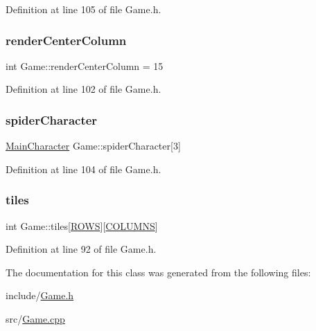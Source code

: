 Definition at line 105 of file Game.\+h.

\mbox{\label{class_game_a7850257252f36f13b0daa694e43e1de9}} 
\subsubsection{\texorpdfstring{renderCenterColumn}{renderCenterColumn}}
{\footnotesize\ttfamily int Game\+::render\+Center\+Column = 15}



Definition at line 102 of file Game.\+h.

\mbox{\label{class_game_ad513055bd8c23f50f6b5cf30ed3839c0}} 
\subsubsection{\texorpdfstring{spiderCharacter}{spiderCharacter}}
{\footnotesize\ttfamily \mbox{\hyperlink{class_main_character}{Main\+Character}} Game\+::spider\+Character\mbox{[}3\mbox{]}}



Definition at line 104 of file Game.\+h.

\mbox{\label{class_game_a49404aae4faa4a33d98815cd45662ba0}} 
\subsubsection{\texorpdfstring{tiles}{tiles}}
{\footnotesize\ttfamily int Game\+::tiles\mbox{[}\mbox{\hyperlink{_game_8h_a821282c3fbd7714d8302538a5a674885}{R\+O\+WS}}\mbox{]}\mbox{[}\mbox{\hyperlink{_game_8h_af6c484f782f36b472fb334e72c392801}{C\+O\+L\+U\+M\+NS}}\mbox{]}}



Definition at line 92 of file Game.\+h.



The documentation for this class was generated from the following files\+:\begin{DoxyCompactItemize}
\item 
include/\mbox{\hyperlink{_game_8h}{Game.\+h}}\item 
src/\mbox{\hyperlink{_game_8cpp}{Game.\+cpp}}\end{DoxyCompactItemize}
